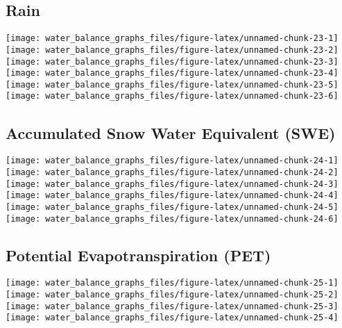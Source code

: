 \documentclass[
]{article}
\begin{document}
\hypertarget{rain}{%
\subsection{Rain}\label{rain}}

\texttt{[image: water\_balance\_graphs\_files/figure-latex/unnamed-chunk-23-1]}
\texttt{[image: water\_balance\_graphs\_files/figure-latex/unnamed-chunk-23-2]}
\texttt{[image: water\_balance\_graphs\_files/figure-latex/unnamed-chunk-23-3]}
\texttt{[image: water\_balance\_graphs\_files/figure-latex/unnamed-chunk-23-4]}
\texttt{[image: water\_balance\_graphs\_files/figure-latex/unnamed-chunk-23-5]}
\texttt{[image: water\_balance\_graphs\_files/figure-latex/unnamed-chunk-23-6]}

\hypertarget{accumulated-snow-water-equivalent-swe}{%
\subsection{Accumulated Snow Water Equivalent
(SWE)}\label{accumulated-snow-water-equivalent-swe}}

\texttt{[image: water\_balance\_graphs\_files/figure-latex/unnamed-chunk-24-1]}
\texttt{[image: water\_balance\_graphs\_files/figure-latex/unnamed-chunk-24-2]}
\texttt{[image: water\_balance\_graphs\_files/figure-latex/unnamed-chunk-24-3]}
\texttt{[image: water\_balance\_graphs\_files/figure-latex/unnamed-chunk-24-4]}
\texttt{[image: water\_balance\_graphs\_files/figure-latex/unnamed-chunk-24-5]}
\texttt{[image: water\_balance\_graphs\_files/figure-latex/unnamed-chunk-24-6]}

\hypertarget{potential-evapotranspiration-pet}{%
\subsection{Potential Evapotranspiration
(PET)}\label{potential-evapotranspiration-pet}}

\texttt{[image: water\_balance\_graphs\_files/figure-latex/unnamed-chunk-25-1]}
\texttt{[image: water\_balance\_graphs\_files/figure-latex/unnamed-chunk-25-2]}
\texttt{[image: water\_balance\_graphs\_files/figure-latex/unnamed-chunk-25-3]}
\texttt{[image: water\_balance\_graphs\_files/figure-latex/unnamed-chunk-25-4]}
\end{document}

